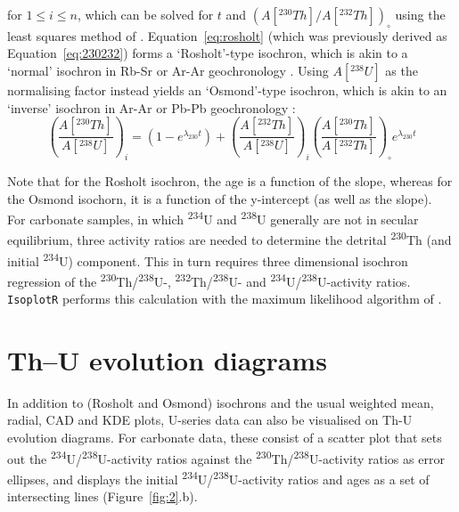 \begin{refsection}
\noindent for $1 \leq i \leq n$, which can be solved for $t$ and
$\left(A[{}^{230}Th]/A[{}^{232}Th]\right)_\circ$ using the least
squares method of \citet{york2004}. Equation~\ref{eq:rosholt} (which
was previously derived as Equation~\ref{eq:230232}) forms a
`Rosholt'-type isochron, which is akin to a `normal' isochron in Rb-Sr
or Ar-Ar geochronology \citep{rosholt1976}. Using $A[{}^{238}U]$ as
the normalising factor instead yields an `Osmond'-type isochron, which
is akin to an `inverse' isochron in Ar-Ar or Pb-Pb geochronology
\citep{osmond1970, ludwig2003b}:
\begin{equation}
  \left(\frac{A[{}^{230}Th]}{A[{}^{238}U]}\right)_i =
  \left(1-e^{\lambda_{230}t}\right) +
  \left(\frac{A[{}^{232}Th]}{A[{}^{238}U]}\right)_i
  \left(\frac{A[{}^{230}Th]}{A[{}^{232}Th]}\right)_\circ
  e^{\lambda_{230}t}
  \label{eq:osmond}
\end{equation}

Note that for the Rosholt isochron, the age is a function of the
slope, whereas for the Osmond isochorn, it is a function of the
y-intercept (as well as the slope).\\

For carbonate samples, in which \textsuperscript{234}U and
\textsuperscript{238}U generally are not in secular equilibrium, three
activity ratios are needed to determine the detrital
\textsuperscript{230}Th (and initial \textsuperscript{234}U)
component. This in turn requires three dimensional isochron regression
of the \textsuperscript{230}Th/\textsuperscript{238}U-,
\textsuperscript{232}Th/\textsuperscript{238}U- and
\textsuperscript{234}U/\textsuperscript{238}U-activity
ratios. \texttt{IsoplotR} performs this calculation with the maximum
likelihood algorithm of \citet{ludwig1994}.\\

\section{Th--U evolution diagrams}

In addition to (Rosholt and Osmond) isochrons and the usual weighted
mean, radial, CAD and KDE plots, U-series data can also be visualised
on Th-U evolution diagrams.  For carbonate data, these consist of a
scatter plot that sets out the
\textsuperscript{234}U/\textsuperscript{238}U-activity ratios against
the \textsuperscript{230}Th/\textsuperscript{238}U-activity ratios as
error ellipses, and displays the initial
\textsuperscript{234}U/\textsuperscript{238}U-activity ratios and ages
as a set of intersecting lines (Figure~\ref{fig:2}.b).\\


\end{refsection}

